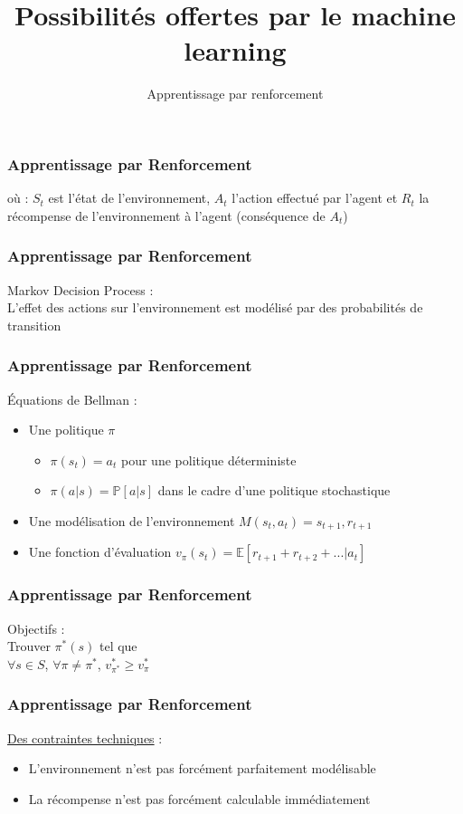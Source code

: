 \documentclass{formation}
\title{Possibilités offertes par le machine learning}
\subtitle{Apprentissage par renforcement}
\begin{document}
\maketitle

\begin{frame}
  \frametitle{Apprentissage par Renforcement}
  où :
  \newline
  $S_t$ est l'état de l'environnement,
  \newline
  $A_t$ l'action effectué par l'agent et
  \newline
  $R_t$ la récompense de l'environnement à l'agent (conséquence de $A_t$)
\end{frame}


\begin{frame}
  \frametitle{Apprentissage par Renforcement}
  Markov Decision Process :\\
  \newline
  L'effet des actions sur l'environnement est modélisé par des probabilités de transition
\end{frame}

\begin{frame}
  \frametitle{Apprentissage par Renforcement}
  Équations de Bellman : 
  \begin{itemize}
  \item Une politique \textbf{$\pi$} 
    \begin{itemize}
    \item $\pi(s_t) = a_t$ pour une politique déterministe
    \item $\pi(a | s) = \mathbb{P}[a|s]$ dans le cadre d'une politique stochastique
    \end{itemize}
  \item Une modélisation de l'environnement \textbf{$M(s_t,a_t)=s_{t+1},r_{t+1}$}
  \item Une fonction d'évaluation \textbf{$v_{\pi}(s_t)$}$ = \mathbb{E}[r_{t+1}+r_{t+2}+...|a_t]$
  \end{itemize}
\end{frame}

\begin{frame}
  \frametitle{Apprentissage par Renforcement}
  Objectifs : \\
  Trouver $\pi^*(s)$ tel que\\
  $\forall s \in S$, $\forall \pi \neq \pi^*$, $v^*_{\pi^*} \geq v^*_{\pi}$
\end{frame}

\begin{frame}
  \frametitle{Apprentissage par Renforcement}
  \underline{Des contraintes techniques} :
  \begin{itemize}
  \item L'environnement n'est pas forcément parfaitement modélisable
  \item La récompense n'est pas forcément calculable immédiatement
  \end{itemize}
\end{frame}
\end{document}
